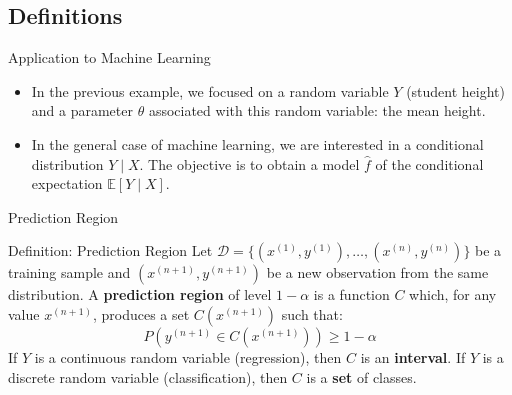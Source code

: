 \subsection[Definitions]{Definitions}

\begin{frame}{Application to Machine Learning}
	\begin{itemize}
		\item In the previous example, we focused on a random variable $Y$ (student height) and a parameter $\theta$ associated with this random variable: the mean height.
		\pause
		\item In the general case of machine learning, we are interested in a conditional distribution $Y \mid X$. The objective is to obtain a model $\hat{f}$ of the conditional expectation $\mathbb{E}[Y \mid X]$.
	\end{itemize}
\end{frame}

\begin{frame}{Prediction Region}
	\begin{block}{Definition: Prediction Region}
		Let $\mathcal{D} = \{(x^{(1)}, y^{(1)}), \dots, (x^{(n)}, y^{(n)})\}$ be a training sample and $(x^{(n+1)}, y^{(n+1)})$ be a new observation from the same distribution. A \textbf{prediction region} of level $1 - \alpha$ is a function $C$ which, for any value $x^{(n+1)}$, produces a set $C(x^{(n+1)})$ such that:
		\begin{equation}
			P\left(y^{(n+1)} \in C\left(x^{(n+1)}\right)\right) \ge 1 - \alpha
			\nonumber
		\end{equation}
		If $Y$ is a continuous random variable (regression), then $C$ is an \textbf{interval}. If $Y$ is a discrete random variable (classification), then $C$ is a \textbf{set} of classes. 
	\end{block}
\end{frame}


